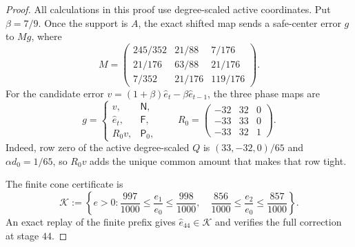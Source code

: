 \begin{proof}
All calculations in this proof use degree-scaled active coordinates.  Put
$\beta=7/9$.  Once the support is $A$, the exact shifted map sends a
safe-center error $g$ to $Mg$, where
\begin{equation}
 M=
 \begin{pmatrix}
 245/352&21/88&7/176\\
 21/176&63/88&21/176\\
 7/352&21/176&119/176
 \end{pmatrix}.
 \label{eq:aesp-cd-p4-fixed-map}
\end{equation}
For the candidate error
$v=(1+\beta)\widehat e_t-\beta\widehat e_{t-1}$, the three phase maps are
\begin{equation}
 g=
 \begin{cases}
 v,&\mathsf N,\\
 \widehat e_t,&\mathsf F,\\
 R_0v,&\mathsf P_0,
 \end{cases}
 \qquad
 R_0=
 \begin{pmatrix}
 -32&32&0\\
 -33&33&0\\
 -33&32&1
 \end{pmatrix}.
 \label{eq:aesp-cd-p4-phase-maps}
\end{equation}
Indeed, row zero of the active degree-scaled $Q$ is
$(33,-32,0)/65$ and $\alpha d_0=1/65$, so $R_0v$ adds the unique common
amount that makes that row tight.

The finite cone certificate is
\begin{equation}
 \mathcal K:=\left\{e>0:
 \frac{997}{1000}\leq\frac{e_1}{e_0}\leq\frac{998}{1000},
 \quad
 \frac{856}{1000}\leq\frac{e_2}{e_0}\leq\frac{857}{1000}
 \right\}.
 \label{eq:aesp-cd-p4-invariant-cone}
\end{equation}
An exact replay of the finite prefix gives $\widehat e_{44}\in\mathcal K$
and verifies the full correction at stage $44$.


\end{proof}
